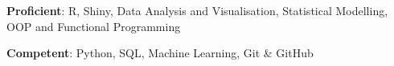 \textbf{Proficient}: R, Shiny, Data Analysis and Visualisation, Statistical Modelling, OOP and Functional Programming

\textbf{Competent}: Python, SQL, Machine Learning, Git \& GitHub

